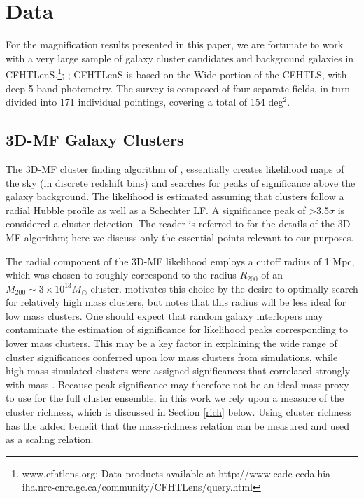 
\section{Data}
\label{data}
For the magnification results presented in this paper, we are fortunate to work with a very large sample of galaxy cluster candidates and background galaxies in \ac{CFHTLenS}.\footnote[1]{www.cfhtlens.org; Data products available at http://www.cadc-ccda.hia-iha.nrc-cnrc.gc.ca/\-community/\-CFHTLens/\-query.html}; \citet{Erben13}; \citet{Hildebrandt12} \ac{CFHTLenS} is based on the Wide portion of the \acf{CFHTLS}, with deep 5 band photometry. The survey is composed of four separate fields, in turn divided into 171 individual pointings, covering a total of 154 deg$^2$.

\subsection{\ac{3D-MF} Galaxy Clusters}
\label{clusters}
The \ac{3D-MF} cluster finding algorithm of \citet{Milkeraitis10}, essentially creates likelihood maps of the sky (in discrete redshift bins) and searches for peaks of significance above the galaxy background. The likelihood is estimated assuming that clusters follow a radial Hubble profile as well as a Schechter \ac{LF}. A significance peak of \textgreater 3.5$\sigma$ is considered a cluster detection. The reader is referred to \citet{Milkeraitis10} for the details of the \ac{3D-MF} algorithm; here we discuss only the essential points relevant to our purposes. 

The radial component of the \ac{3D-MF} likelihood employs a cutoff radius of 1 Mpc, which was chosen to roughly correspond to the radius $R_{200}$ of an $M_{200} \sim 3 \times 10^{13} M_{\odot}$ cluster. \citet{Milkeraitis10} motivates this choice by the desire to optimally search for relatively high mass clusters, but notes that this radius will be less ideal for low mass clusters. One should expect that random galaxy interlopers may contaminate the estimation of significance for likelihood peaks corresponding to lower mass clusters. This may be a key factor in explaining the wide range of cluster significances conferred upon low mass clusters from simulations, while high mass simulated clusters were assigned significances that correlated strongly with mass \citep[see Figure 10 in][]{Milkeraitis10}. Because peak significance may therefore not be an ideal mass proxy to use for the full cluster ensemble, in this work we rely upon a measure of the cluster richness, which is discussed in Section \ref{rich} below. Using cluster richness has the added benefit that the mass-richness relation can be measured and used as a scaling relation.

